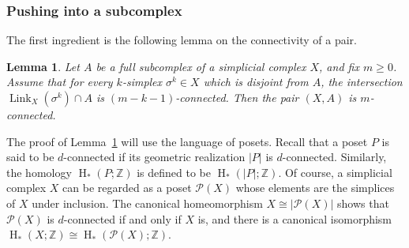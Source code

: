 \documentclass[11 pt]{article}
\theoremstyle{plain}
\newtheorem{lemma}[theorem]{Lemma}
\theoremstyle{definition}
\numberwithin{equation}{section}
\newcommand\Z{\ensuremath{\mathbb{Z}}}
\DeclareMathOperator{\HH}{H}
\DeclareMathOperator{\Link}{Link}
\newcommand\Poset{\ensuremath{\mathcal{P}}}
\newcommand\abs[1]{\left\lvert#1\right\rvert}
\newcommand\iso{\cong}
\begin{document}
\subsubsection{Pushing into a subcomplex} 
The first ingredient is the following lemma on the connectivity of a pair.

\begin{lemma}
\label{lemma:pushing}
Let $A$ be a full subcomplex of a simplicial complex $X$, and fix $m \geq 0$. Assume
that for every $k$-simplex $\sigma^k \in X$ which is disjoint from $A$, the intersection
$\Link_X(\sigma^k) \cap A$ is $(m-k-1)$-connected.  Then the pair $(X,A)$ is $m$-connected.
\end{lemma}

The proof of Lemma~\ref{lemma:pushing} will use the language of posets.
Recall that a poset $P$ is said to be $d$-connected if its geometric realization $\abs{P}$ is $d$-connected. Similarly, the homology $\HH_{\ast}(P;\Z)$ is defined to be $\HH_{\ast}(\abs{P};\Z)$. Of course, a simplicial complex $X$ can be regarded as a poset $\Poset(X)$ whose elements are the simplices of $X$ under inclusion. The canonical homeomorphism $X\iso \abs{\Poset(X)}$ shows that $\Poset(X)$ is $d$-connected if and only if $X$ is, and there is a canonical isomorphism $\HH_{\ast}(X;\Z)\iso \HH_{\ast}(\Poset(X);\Z)$.
\end{document}
